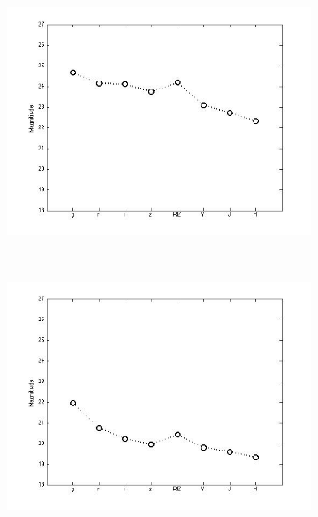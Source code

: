 \documentclass[useAMS,usenatbib,fleqn]{mn2e}
\begin{document}
\begin{figure}
\begin{subfigure}[b]{0.075\textwidth}
                \includegraphics[trim = 35px 15px 50px 25px, clip=true,width=\textwidth]{figures/basis_05.jpg}
        \end{subfigure}
        ~
        \begin{subfigure}[b]{0.075\textwidth}
                \includegraphics[trim = 35px 15px 50px 25px, clip=true,width=\textwidth]{figures/basis_06.jpg}
        \end{subfigure}
        ~
        \begin{subfigure}[b]{0.075\textwidth}

\end{subfigure}
\end{figure}
\end{document}
